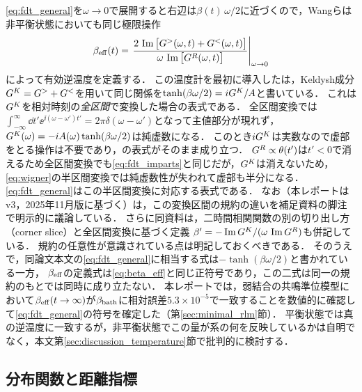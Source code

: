 \documentclass[a4paper,11pt,onecolumn,baselineskip=14.5pt]{jlreq}
\begin{document}
\eqref{eq:fdt_general}を$\omega\to0$で展開すると右辺は$\beta(t)\,\omega/2$に近づくので，Wangら\cite{Wang2024}は非平衡状態においても同じ極限操作
\begin{equation}
  \beta_{\mathrm{eff}}(t) = \left.
  \frac{2\,\Im\big[G^{>}(\omega,t)+G^{<}(\omega,t)\big]}
       {\omega\,\Im\big[G^{R}(\omega,t)\big]}
  \right|_{\omega\to0}
  \label{eq:beta_eff}
\end{equation}
によって有効逆温度を定義する．
この温度計を最初に導入した\cite{Eberlein2017}は，Keldysh成分$G^{K}=G^{>}+G^{<}$を用いて同じ関係を$\tanh(\beta\omega/2)=iG^{K}/A$と書いている．
これは$G^{K}$を相対時刻の\emph{全区間}で変換した場合の表式である．
全区間変換では$\int_{-\infty}^{\infty}\dd{t'}\ee^{\ii(\omega-\omega')t'}=2\pi\delta(\omega-\omega')$となって主値部分が現れず，$G^{K}(\omega)=-i A(\omega)\tanh(\beta\omega/2)$は純虚数になる．
このとき$iG^{K}$は実数なので虚部をとる操作は不要であり，\cite{Eberlein2017}の表式がそのまま成り立つ．
$G^{R}\propto\theta(t')$は$t'<0$で消えるため全区間変換でも\eqref{eq:fdt_imparts}と同じだが，$G^{K}$は消えないため，\eqref{eq:wigner}の半区間変換では純虚数性が失われて虚部も半分になる．
\eqref{eq:fdt_general}はこの半区間変換に対応する表式である．
なお\cite{Wang2024}（本レポートはv3，2025年11月版に基づく）は，この変換区間の規約の違いを補足資料の脚注で明示的に議論している．
さらに同資料は，二時間相関関数の別の切り出し方（corner slice）と全区間変換に基づく定義
$\beta'=-\Im G^{K}/(\omega\,\Im G^{R})$も併記している．
規約の任意性が意識されている点は明記しておくべきである．
そのうえで，同論文本文の\eqref{eq:fdt_general}に相当する式は$-\tanh(\beta\omega/2)$と書かれている一方，
$\beta_{\mathrm{eff}}$の定義式は\eqref{eq:beta_eff}と同じ正符号であり，この二式は同一の規約のもとでは同時に成り立たない．
本レポートでは，弱結合の共鳴準位模型において$\beta_{\mathrm{eff}}(t\to\infty)$が$\beta_{\mathrm{bath}}$に相対誤差$5.3\times10^{-5}$で一致することを数値的に確認して\eqref{eq:fdt_general}の符号を確定した（第\ref{sec:minimal_rlm}節）．
平衡状態では真の逆温度に一致するが，非平衡状態でこの量が系の何を反映しているかは自明でなく，本文第\ref{sec:discussion_temperature}節で批判的に検討する．

\subsection{分布関数と距離指標}
\label{sec:appendix_distance}
\end{document}
